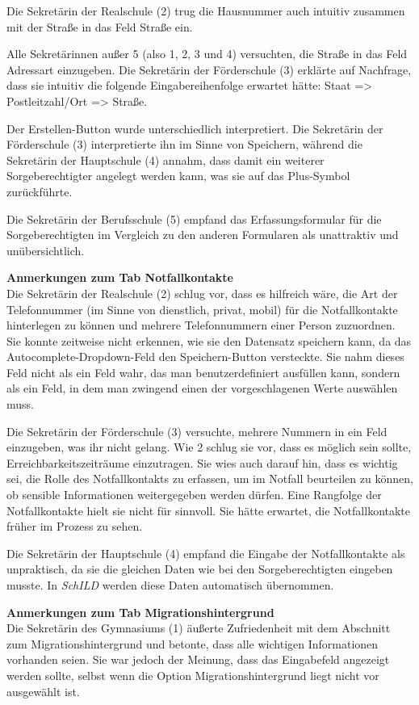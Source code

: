 Die Sekretärin der Realschule (2) trug die Hausnummer auch intuitiv zusammen mit der Straße in das Feld \glqq Straße\grqq{} ein.

Alle Sekretärinnen außer 5 (also 1, 2, 3 und 4) versuchten, die Straße in das Feld \glqq Adressart\grqq{} einzugeben. Die Sekretärin der Förderschule (3) erklärte auf Nachfrage, dass sie intuitiv die folgende Eingabereihenfolge erwartet hätte: Staat => Postleitzahl/Ort => Straße.

Der \glqq Erstellen\grqq{}-Button wurde unterschiedlich interpretiert. Die Sekretärin der Förderschule (3) interpretierte ihn im Sinne von \glqq Speichern\grqq{}, während die Sekretärin der Hauptschule (4) annahm, dass damit ein weiterer Sorgeberechtigter angelegt werden kann, was sie auf das Plus-Symbol zurückführte.

Die Sekretärin der Berufsschule (5) empfand das Erfassungsformular für die Sorgeberechtigten im Vergleich zu den anderen Formularen als unattraktiv und unübersichtlich.

\textbf{Anmerkungen zum Tab \glqq Notfallkontakte\grqq{}}\\
Die Sekretärin der Realschule (2) schlug vor, dass es hilfreich wäre, die Art der Telefonnummer (im Sinne von dienstlich, privat, mobil) für die Notfallkontakte hinterlegen zu können und mehrere Telefonnummern einer Person zuzuordnen. Sie konnte zeitweise nicht erkennen, wie sie den Datensatz speichern kann, da das Autocomplete-Dropdown-Feld den Speichern-Button versteckte. Sie nahm dieses Feld nicht als ein Feld wahr, das man benutzerdefiniert ausfüllen kann, sondern als ein Feld, in dem man zwingend einen der vorgeschlagenen Werte auswählen muss.

Die Sekretärin der Förderschule (3) versuchte, mehrere Nummern in ein Feld einzugeben, was ihr nicht gelang. Wie 2 schlug sie vor, dass es möglich sein sollte, Erreichbarkeitszeiträume einzutragen. Sie wies auch darauf hin, dass es wichtig sei, die Rolle des Notfallkontakts zu erfassen, um im Notfall beurteilen zu können, ob sensible Informationen weitergegeben werden dürfen. Eine Rangfolge der Notfallkontakte hielt sie nicht für sinnvoll. Sie hätte erwartet, die Notfallkontakte früher im Prozess zu sehen.

Die Sekretärin der Hauptschule (4) empfand die Eingabe der Notfallkontakte als unpraktisch, da sie die gleichen Daten wie bei den Sorgeberechtigten eingeben musste. In \textit{SchILD} werden diese Daten automatisch übernommen.

\textbf{Anmerkungen zum Tab \glqq Migrationshintergrund\grqq{}}\\
Die Sekretärin des Gymnasiums (1) äußerte Zufriedenheit mit dem Abschnitt zum Migrationshintergrund und betonte, dass alle wichtigen Informationen vorhanden seien. Sie war jedoch der Meinung, dass das Eingabefeld angezeigt werden sollte, selbst wenn die Option \glqq Migrationshintergrund liegt nicht vor\grqq{} ausgewählt ist.

